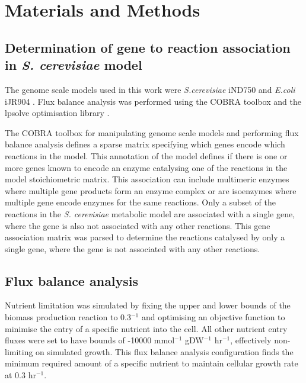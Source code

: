 \clearpage

\section{Materials and Methods}%

\subsection{Determination of gene to reaction association in \emph{S. cerevisiae} model}%

The genome scale models used in this work were \emph{S.cerevisiae} iND750 \cite{duarte2004a} and \emph{E.coli} iJR904 \cite{reed2003}. Flux balance analysis was performed using the COBRA toolbox \cite{becker2007} and the lpsolve optimisation library \cite{lpsolve}.

The COBRA toolbox for manipulating genome scale models and performing flux balance analysis defines a sparse matrix specifying which genes encode which reactions in the model. This annotation of the model defines if there is one or more genes known to encode an enzyme catalysing one of the reactions in the model stoichiometric matrix. This association can include multimeric enzymes where multiple gene products form an enzyme complex or are isoenzymes where multiple gene encode enzymes for the same reactions. Only a subset of the reactions in the \emph{S. cerevisiae} metabolic model are associated with a single gene, where the gene is also not associated with any other reactions. This gene association matrix was parsed to determine the reactions catalysed by only a single gene, where the gene is not associated with any other reactions.

\subsection{Flux balance analysis}%

Nutrient limitation was simulated by fixing the upper and lower bounds of the biomass production reaction to 0.3$^{-1}$ and optimising an objective function to minimise the entry of a specific nutrient into the cell. All other nutrient entry fluxes were set to have bounds of -10000 mmol$^{-1}$ gDW$^{-1}$ hr$^{-1}$, effectively non-limiting on simulated growth. This flux balance analysis configuration finds the minimum required amount of a specific nutrient to maintain cellular growth rate at 0.3 hr$^{-1}$.

